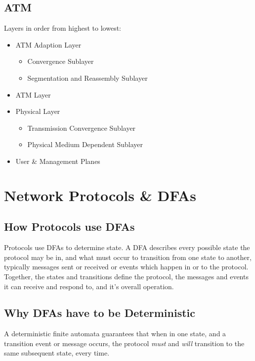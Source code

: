 \documentclass{article}
\begin{document}
\subsection{ATM}
Layers in order from highest to lowest:
\begin{itemize}
\item ATM Adaption Layer
\begin{itemize}
\item Convergence Sublayer
\item Segmentation and Reassembly Sublayer
\end{itemize}
\item ATM Layer
\item Physical Layer
\begin{itemize}
\item Transmission Convergence Sublayer
\item Physical Medium Dependent Sublayer
\end{itemize}
\item User \& Management Planes 
\end{itemize}
\section{Network Protocols \& DFAs}
\subsection{How Protocols use DFAs}
Protocols use DFAs to determine state. A DFA describes every possible state the
protocol may be in, and what must occur to transition from one state to another,
typically messages sent or received or events which happen in or to the
protocol. Together, the states and transitions define the protocol, the messages
and events it can receive and respond to, and it's overall operation.

\subsection{Why DFAs have to be Deterministic}
A deterministic finite automata guarantees that when in one state, and a
transition event or message occurs, the protocol \emph{must} and \emph{will}
transition to the same subsequent state, every time.
\end{document}
